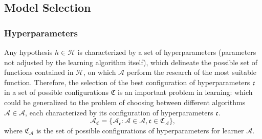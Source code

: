 \subsection{Model Selection}
\label{subsec:ms}
\subsubsection{Hyperparameters}
Any hypothesis $h \in \mathcal{H} $ is characterized by a set of hyperparameters (parameters not adjusted by the learning algorithm itself), which delineate the possible set of functions contained in $\mathcal{H}$, on which $\mathscr{A}$ perform the research of the most suitable function. %
Therefore, the selection of the best configuration of hyperparameters $\mathfrak{c}$ in a set of possible configurations $\mathfrak{C}$ is an important problem in learning:
which could be generalized to the problem of choosing between different algorithms $\mathscr{A} \in \mathcal{A}$, each characterized by its configuration of hyperparameters $\mathfrak{c}$.
\begin{equation}
 \mathcal{A}_\mathfrak{C} = \{\mathscr{A}_{\mathfrak{c}} : \mathscr{A} \in \mathcal{A}, \mathfrak{c} \in \mathfrak{C}_{\mathscr{A}} \},
   \end{equation}
where $\mathfrak{C}_{\mathscr{A}}$ is the set of possible configurations of hyperparameters for learner $\mathscr{A}$.%

